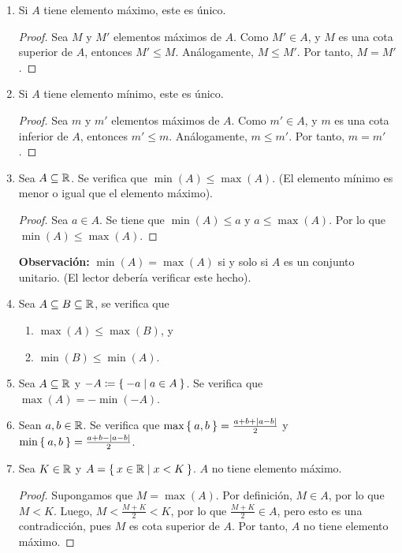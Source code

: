 \begin{enumerate}[label=\alph*)]
  \item Si $A$ tiene elemento máximo, este es único.
  
  \begin{proof}\leavevmode
    Sea $M$ y $M'$ elementos máximos de $A$. Como $M'\in A$, y $M$ es una cota superior de $A$, entonces $M'\leq M$. Análogamente, $M\leq M'$. Por tanto, $M=M'$.
  \end{proof}
  
  \item Si $A$ tiene elemento mínimo, este es único.
  \begin{proof}\leavevmode
    Sea $m$ y $m'$ elementos máximos de $A$. Como $m'\in A$, y $m$ es una cota inferior de $A$, entonces $m'\leq m$. Análogamente, $m\leq m'$. Por tanto, $m=m'$.
  \end{proof}
  
  \item Sea $A\subseteq \mathbb{R}$. Se verifica que $\min(A)\leq \max(A)$.
  (El elemento mínimo es menor o igual que el elemento máximo).
  \begin{proof}\leavevmode
    Sea $a\in A$. Se tiene que $\min(A)\leq a$ y $a\leq \max(A)$. Por lo que $\min(A)\leq \max(A)$.
  \end{proof}
  
  \textbf{Observación:} $\min(A)=\max(A)$ si y solo si $A$ es un conjunto unitario. (El lector debería verificar este hecho).
  
  \item Sea $A\subseteq B \subseteq \mathbb{R}$, se verifica que
  \begin{enumerate}[label=\roman*)]
    \item $\max(A) \leq \max(B)$, y
    \item $\min(B)\leq \min(A)$.
  \end{enumerate}
  
  \item Sea $A\subseteq \mathbb{R}$ y $-A\coloneqq \Set{-a| a\in A}$. Se verifica que $\max(A)=-\min(-A)$.
  
  \item Sean $a,b\in \mathbb{R}$. Se verifica que $\max\Set{a, b} = \frac{a+b+|a-b|}{2}$ y $\min\Set{a, b} = \frac{a+b-|a-b|}{2}$.
  
  \item Sea $K\in \mathbb{R}$ y $A=\Set{x\in \mathbb{R}|x<K}$. $A$ no tiene elemento máximo.
  \begin{proof}\leavevmode
    Supongamos que $M=\max(A)$. Por definición, $M\in A$, por lo que $M<K$. Luego, $M<\frac{M+K}{2}<K$, por lo que $\frac{M+K}{2}\in A$, pero esto es una contradicción, pues $M$ es cota superior de $A$. Por tanto, $A$ no tiene elemento máximo.
  \end{proof}
  

\end{enumerate}
